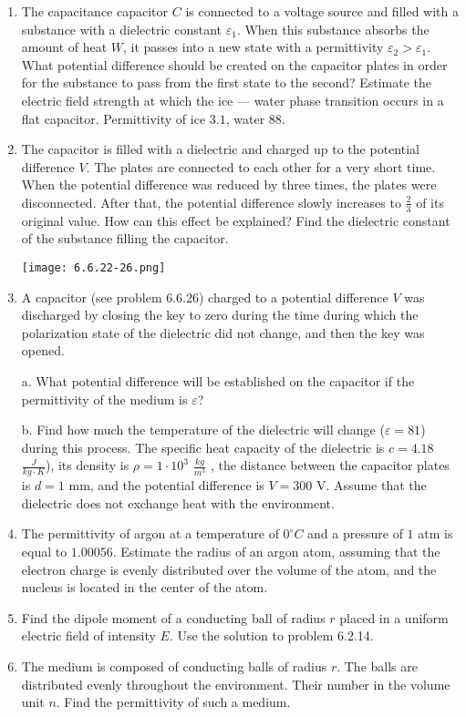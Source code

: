 \documentclass{article}
\begin{document}
\begin{enumerate}[label=6.6.\arabic*]
\item The capacitance capacitor $C$ is connected to a voltage source and filled with a substance with a dielectric constant $\varepsilon_1$. When this substance absorbs the amount of heat $W$, it passes into a new state with a permittivity $\varepsilon_2 > \varepsilon_1$. What potential difference should be created on the capacitor plates in order for the substance to pass from the first state to the second? Estimate the electric field strength at which the ice — water phase transition occurs in a flat capacitor. Permittivity of ice $3.1$, water $88$.

\item The capacitor is filled with a dielectric and charged up to the potential difference $V$. The plates are connected to each other for a very short time. When the potential difference was reduced by three times, the plates were disconnected. After that, the potential difference slowly increases to $\frac{2}{3}$ of its original value. How can this effect be explained? Find the dielectric constant of the substance filling the capacitor.

\begin{center}
    \texttt{[image: 6.6.22-26.png]}
\end{center}

\item A capacitor (see problem 6.6.26) charged to a potential difference $V$ was discharged by closing the key to zero during the time during which the polarization state of the dielectric did not change, and then the key was opened.

a. What potential difference will be established on the capacitor if the permittivity of the medium is $\varepsilon$? 

b. Find how much the temperature of the dielectric will change ($\varepsilon = 81$) during this process. The specific heat capacity of the dielectric is $c = 4.18$ $\frac{J}{kg \cdot K}$), its density is $\rho = 1 \cdot 10^3$ $\frac{kg}{m^3}$ , the distance between the capacitor plates is $d = 1$ mm, and the potential difference is $V = 300$ V. Assume that the dielectric does not exchange heat with the environment.

\item The permittivity of argon at a temperature of $0^\circ C$ and a pressure of $1$ atm is equal to $1.00056$. Estimate the radius of an argon atom, assuming that the electron charge is evenly distributed over the volume of the atom, and the nucleus is located in the center of the atom.

\item Find the dipole moment of a conducting ball of radius $r$ placed in a uniform electric field of intensity $E$. Use the solution to problem 6.2.14.

\item The medium is composed of conducting balls of radius $r$. The balls are distributed evenly throughout the environment. Their number in the volume unit $n$. Find the permittivity of such a medium.

\end{enumerate}
\end{document}

